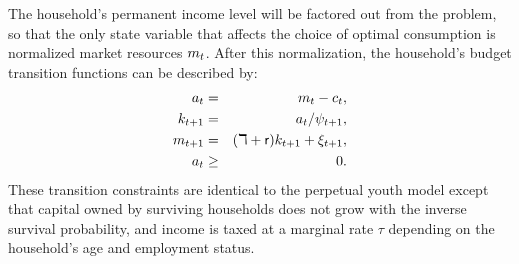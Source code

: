 \documentclass[12pt,titlepage]{econtex}
\begin{document}
The household's permanent income level will be factored out from the problem, so that the only state variable that affects the choice of optimal consumption is normalized market resources $m_t$.  After this normalization, the household's budget transition functions can be described by:
\begin{eqnarray}
\label{LifeCycleConstraint1}
a_t &=& m_t - c_t,\\
\label{LifeCycleConstraint2}
k_{t+1} &=& a_t/\psi_{t+1},\\
\label{LifeCycleConstraint3}
m_{t+1} &=& (\daleth +\mathsf{r}) k_{t+1} + \xi_{t+1},\\
\label{LifeCycleConstraint4}
a_t &\geq& 0.
\end{eqnarray}
These transition constraints are identical to the perpetual youth model except that capital owned by surviving households does not grow with the inverse survival probability, and income is taxed at a marginal rate $\tau$ depending on the household's age and employment status.
\end{document}
